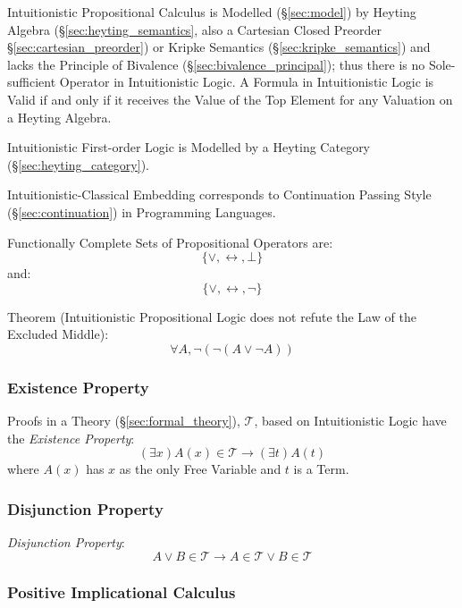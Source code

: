Intuitionistic Propositional Calculus is Modelled (\S\ref{sec:model})
by Heyting Algebra (\S\ref{sec:heyting_semantics}, also a Cartesian
Closed Preorder \S\ref{sec:cartesian_preorder}) or Kripke Semantics
(\S\ref{sec:kripke_semantics}) and lacks the Principle of Bivalence
(\S\ref{sec:bivalence_principal}); thus there is no Sole-sufficient
Operator in Intuitionistic Logic. A Formula in Intuitionistic Logic is
Valid if and only if it receives the Value of the Top Element for any
Valuation on a Heyting Algebra.

Intuitionistic First-order Logic is Modelled by a Heyting Category
(\S\ref{sec:heyting_category}).

Intuitionistic-Classical Embedding corresponds to Continuation Passing
Style (\S\ref{sec:continuation}) in Programming Languages.

Functionally Complete Sets of Propositional Operators are:
\[
  \{ \vee, \leftrightarrow, \bot \}
\]
and:
\[
  \{ \vee, \leftrightarrow, \neg \}
\]

Theorem (Intuitionistic Propositional Logic does not refute the Law of
the Excluded Middle)\cite{harper12}:
\[
  \forall A, \neg (\neg (A \vee \neg A))
\]



\subsubsection{Existence Property}\label{sec:existence_property}

Proofs in a Theory (\S\ref{sec:formal_theory}), $\mathcal{T}$, based
on Intuitionistic Logic have the \emph{Existence Property}:
\[
  (\exists x)A(x) \in \mathcal{T} \rightarrow (\exists t)A(t)
\]
where $A(x)$ has $x$ as the only Free Variable and $t$ is a Term.



\subsubsection{Disjunction Property}\label{sec:disjunction_property}

\emph{Disjunction Property}:
\[
  A \vee B \in \mathcal{T}
  \rightarrow A \in \mathcal{T} \vee B \in \mathcal{T}
\]



\subsubsection{Positive Implicational Calculus}
\label{sec:positive_implicational}



